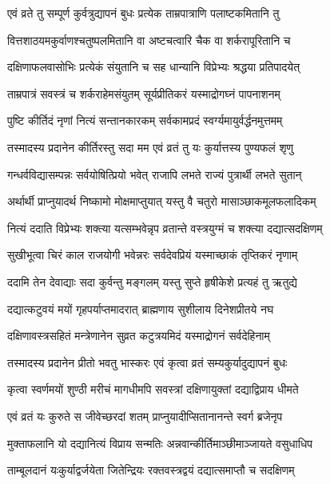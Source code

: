 \twolineshloka
{एवं व्रते तु सम्पूर्ण कुर्वत्रुद्यापनं बुधः}
{प्रत्येक ताम्रपात्राणि पलाष्टकमितानि तु} %

\twolineshloka
{वित्तशाठयमकुर्वाणश्चतुष्पलमितानि वा}
{अष्टचत्वारि चैक वा शर्करापूरितानि च} %

\twolineshloka
{दक्षिणाफलवासोभिः प्रत्येकं संयुतानि च}
{सह धान्यानि विप्रेभ्यः श्रद्धया प्रतिपादयेत्} %

\twolineshloka
{ताम्रपात्रं सवस्त्रं च शर्कराहेमसंयुतम्}
{सूर्यप्रीतिकरं यस्माद्रोगघ्नं पापनाशनम्} %

\twolineshloka
{पुष्टि कीर्तिदं नृणां नित्यं सन्तानकारकम्}
{सर्वकामप्रदं स्वर्ग्यमायुर्वर्द्धनमुत्तमम्} %

\twolineshloka
{तस्मादस्य प्रदानेन कीर्तिरस्तु सदा मम}
{एवं व्रतं तु यः कुर्यात्तस्य पुण्यफलं शृणु} %

\twolineshloka
{गन्धर्वविद्यासम्पन्नः सर्वयोषित्प्रियो भवेत्}
{राजापि लभते राज्यं पुत्रार्थी लभते सुतान्} %

\twolineshloka
{अर्थार्थी प्राप्नुयादर्थ निष्कामो मोक्षमाप्तुयात्}
{यस्तु वै चतुरो मासाञ्छाकमूलफलादिकम्} %

\twolineshloka
{नित्यं ददाति विप्रेभ्यः शक्त्या यत्सम्भवेन्नृप}
{व्रतान्ते वस्त्रयुग्मं च शक्त्या दद्यात्सदक्षिणम्} %

\twolineshloka
{सुखीभूत्वा चिरं काल राजयोगी भवेन्नरः}
{सर्वदेवप्रियं यस्माच्छाकं तृप्तिकरं नृणाम्} %

\twolineshloka
{ददामि तेन देवाद्याः सदा कुर्वन्तु मङ्गलम्}
{यस्तु सुप्ते हृषीकेशे प्रत्यहं तु ऋतुद्ये} %

\twolineshloka
{दद्यात्कटुवयं मयों गृहपर्याप्तमादरात्}
{ब्राह्मणाय सुशीलाय दिनेशप्रीतये नघ} %

\twolineshloka
{दक्षिणावस्त्रसहितं मन्त्रेणानेन सुव्रत}
{कटुत्रयमिदं यस्माद्रोगनं सर्वदेहिनाम्} %

\twolineshloka
{तस्मादस्य प्रदानेन प्रीतो भवतु भास्करः}
{एवं कृत्वा व्रतं सम्यकुर्यादुद्यापनं बुधः} %

\twolineshloka
{कृत्वा स्वर्णमयों शुण्ठी मरीचं मागधीमपि}
{सवस्त्रां दक्षिणायुक्तां दद्याद्विप्राय धीमते} %

\twolineshloka
{एवं व्रतं यः कुरुते स जीवेच्छरदां शतम्}
{प्राप्नुयादीप्सितानानन्ते स्वर्ग ब्रजेनृप} %

\twolineshloka
{मुक्ताफलानि यो दद्यानित्यं विप्राय सन्मतिः}
{अन्नवान्कीर्तिमाञ्छीमाञ्जायते वसुधाधिप} %

\twolineshloka
{ताम्बूलदानं यःकुर्याद्वर्जयेता जितेन्द्रियः}
{रक्तवस्त्रद्वयं दद्यात्समाप्तौ च सदक्षिणम्} %

